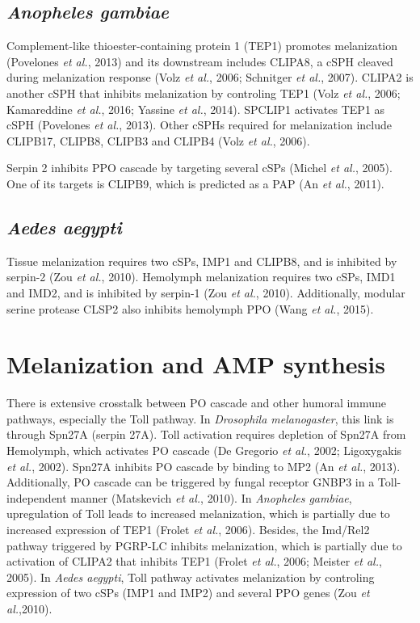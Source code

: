 \documentclass[11pt]{article}
\begin{document}
\subsection{\textit{Anopheles gambiae}}
Complement-like thioester-containing protein 1 (TEP1) promotes melanization (Povelones \textit{et al.}, 2013) and its downstream includes CLIPA8, a cSPH cleaved during melanization response (Volz \textit{et al.}, 2006; Schnitger \textit{et al.}, 2007). 
CLIPA2 is another cSPH that inhibits melanization by controling TEP1 (Volz \textit{et al.}, 2006; Kamareddine \textit{et al.}, 2016; Yassine \textit{et al.}, 2014). 
SPCLIP1 activates TEP1 as cSPH (Povelones \textit{et al.}, 2013). 
Other cSPHs required for melanization include CLIPB17, CLIPB8, CLIPB3 and CLIPB4 (Volz \textit{et al.}, 2006). 

\newline

Serpin 2 inhibits PPO cascade by targeting several cSPs (Michel \textit{et al.}, 2005). 
One of its targets is CLIPB9, which is predicted as a PAP (An \textit{et al.}, 2011).

\subsection{\textit{Aedes aegypti}}
Tissue melanization requires two cSPs, IMP1 and CLIPB8, and is inhibited by serpin-2 (Zou \textit{et al.}, 2010). 
Hemolymph melanization requires two cSPs, IMD1 and IMD2, and is inhibited by serpin-1 (Zou \textit{et al.}, 2010). 
Additionally, modular serine protease CLSP2 also inhibits hemolymph PPO (Wang \textit{et al.}, 2015).

\section{Melanization and AMP synthesis}
There is extensive crosstalk between PO cascade and other humoral immune pathways, especially the Toll pathway. 
In \textit{Drosophila melanogaster}, this link is through Spn27A (serpin 27A). 
Toll activation requires depletion of Spn27A from Hemolymph, which activates PO cascade (De Gregorio \textit{et al.}, 2002; Ligoxygakis \textit{et al.}, 2002). 
Spn27A inhibits PO cascade by binding to MP2 (An \textit{et al.}, 2013). 
Additionally, PO cascade can be triggered by fungal receptor GNBP3 in a Toll-independent manner (Matskevich \textit{et al.}, 2010). 
In \textit{Anopheles gambiae}, upregulation of Toll leads to increased melanization, which is partially due to increased expression of TEP1 (Frolet \textit{et al.}, 2006). 
Besides, the Imd/Rel2 pathway triggered by PGRP-LC inhibits melanization, which is partially due to activation of CLIPA2 that inhibits TEP1 (Frolet \textit{et al.}, 2006; Meister \textit{et al.}, 2005). 
In \textit{Aedes aegypti}, Toll pathway activates melanization by controling expression of two cSPs (IMP1 and IMP2) and several PPO genes (Zou \textit{et al.},2010).
\end{document}
